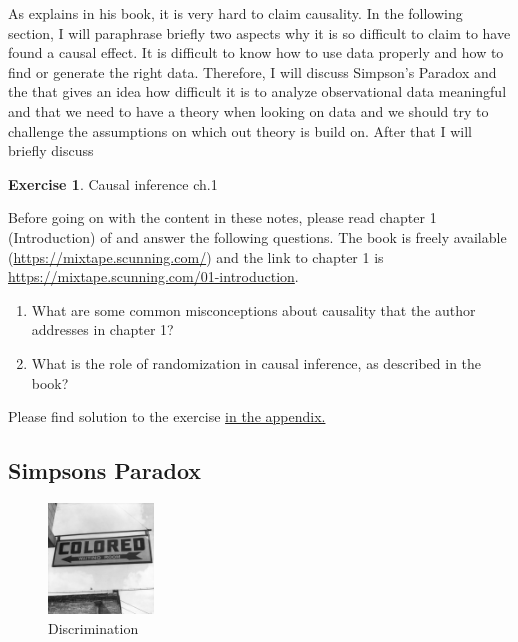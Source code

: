 \documentclass[
  12pt,
  oneside]{book}
\theoremstyle{definition}
\theoremstyle{definition}
\theoremstyle{definition}
\newtheorem{exercise}{Exercise}[chapter]
\theoremstyle{definition}
\theoremstyle{remark}
\begin{document}
As \citet{Cunningham2021Causal} explains in his book, it is very hard to claim causality. In the following section, I will paraphrase briefly two aspects why it is so difficult to claim to have found a causal effect. It is difficult to know how to use data properly and how to find or generate the right data. Therefore, I will discuss Simpson's Paradox and the that gives an idea how difficult it is to analyze observational data meaningful and that we need to have a theory when looking on data and we should try to challenge the assumptions on which out theory is build on. After that I will briefly discuss

\begin{exercise}
\protect\hypertarget{exr:causalinf1}{}\label{exr:causalinf1}Causal inference ch.1

Before going on with the content in these notes, please read chapter 1 (Introduction) of \citet{Cunningham2021Causal} and answer the following questions. The book is freely available (\url{https://mixtape.scunning.com/}) and the link to chapter 1 is \url{https://mixtape.scunning.com/01-introduction}.

\begin{enumerate}
\def\labelenumi{\arabic{enumi}.}
\item
  What are some common misconceptions about causality that the author addresses in chapter 1?
\item
  What is the role of randomization in causal inference, as described in the book?
\end{enumerate}

Please find solution to the exercise \protect\hyperlink{sol:causalinf1}{in the appendix.}
\end{exercise}

\hypertarget{simpsons-paradox}{%
\subsection{Simpsons Paradox}\label{simpsons-paradox}}

\begin{figure}
\centering
\includegraphics[width=0.25\textwidth,height=\textheight]{fig/1943_Colored_Waiting_Room_Sign.jpg}
\caption[\label{fig:waitingroom} Discrimination]{\label{fig:waitingroom} Discrimination\footnotemark{}}
\end{figure}
\end{document}
